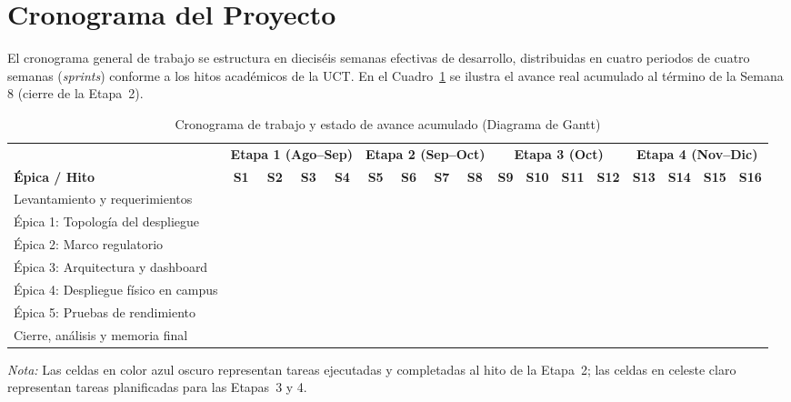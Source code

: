 \documentclass[12pt,oneside,openany,spanish,oldfontcommands]{memoir}
\renewcommand{\arraystretch}{1.15}
\begin{document}
\section{Cronograma del Proyecto}

El cronograma general de trabajo se estructura en dieciséis semanas efectivas de desarrollo,
distribuidas en cuatro periodos de cuatro semanas (\textit{sprints}) conforme a los hitos
académicos de la UCT. En el Cuadro~\ref{tab:gantt-etapa2} se ilustra el avance real acumulado al
término de la Semana 8 (cierre de la Etapa~2).

\begin{table}[H]
\centering
\caption{Cronograma de trabajo y estado de avance acumulado (Diagrama de Gantt)}
\label{tab:gantt-etapa2}
\tiny
\setlength{\tabcolsep}{2.2pt}
\renewcommand{\arraystretch}{1.2}
\begin{tabularx}{\textwidth}{>{\raggedright\arraybackslash}X *{4}{c} | *{4}{c} | *{4}{c} | *{4}{c}}
\toprule
& \multicolumn{4}{c|}{\textbf{Etapa 1 (Ago--Sep)}}
& \multicolumn{4}{c|}{\textbf{Etapa 2 (Sep--Oct)}}
& \multicolumn{4}{c|}{\textbf{Etapa 3 (Oct)}}
& \multicolumn{4}{c}{\textbf{Etapa 4 (Nov--Dic)}} \\
\textbf{Épica / Hito}
& \textbf{S1} & \textbf{S2} & \textbf{S3} & \textbf{S4}
& \textbf{S5} & \textbf{S6} & \textbf{S7} & \textbf{S8}
& \textbf{S9} & \textbf{S10} & \textbf{S11} & \textbf{S12}
& \textbf{S13} & \textbf{S14} & \textbf{S15} & \textbf{S16} \\
\midrule
Levantamiento y requerimientos &
\cellcolor{ganttblue} & \cellcolor{ganttblue} & \cellcolor{ganttblue} & \cellcolor{ganttblue} &
& & & & & & & & & & & \\
Épica 1: Topología del despliegue &
& & & &
\cellcolor{ganttblue} & \cellcolor{ganttblue} & & &
& & & & & & & \\
Épica 2: Marco regulatorio &
& & & &
\cellcolor{ganttblue} & & & &
& & & & & & & \\
Épica 3: Arquitectura y dashboard &
& & & &
& \cellcolor{ganttblue} & \cellcolor{ganttblue} & &
& & & & & & & \\
Épica 4: Despliegue físico en campus &
& & & &
& & \cellcolor{ganttblue} & \cellcolor{ganttblue} &
\cellcolor{ganttlight} & \cellcolor{ganttlight} & \cellcolor{ganttlight} & & & & & \\
Épica 5: Pruebas de rendimiento &
& & & &
& & & \cellcolor{ganttblue} &
\cellcolor{ganttlight} & \cellcolor{ganttlight} & \cellcolor{ganttlight} & &
\cellcolor{ganttlight} & \cellcolor{ganttlight} & & \\
Cierre, análisis y memoria final &
& & & &
& & & &
& & & &
& & \cellcolor{ganttlight} & \cellcolor{ganttlight} \\
\bottomrule
\end{tabularx}

\vspace{0.2cm}
\scriptsize
\textit{Nota:} Las celdas en color azul oscuro representan tareas ejecutadas y completadas al hito de la Etapa~2; las celdas en celeste claro representan tareas planificadas para las Etapas~3 y 4.
\end{table}
\end{document}
